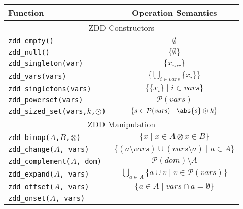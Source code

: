 \documentclass[english, aspectratio=169]{beamer}
\newcommand{\pow}[0]{\ensuremath{\mathcal{P}}}
\newcommand{\var}[0]{\ensuremath{\mathit{var}}}
\newcommand{\vars}[0]{\ensuremath{\mathit{vars}}}
\newcommand{\dom}[0]{\ensuremath{\mathit{dom}}}
\begin{document}
\blankframe



\begin{frame}
  \begin{table}
    \centering
    \tiny

    \begin{tabular}[t]{l | c}
      Function
      & Operation Semantics
      \\ \hline \hline
      \multicolumn{2}{c}{ZDD Constructors}
      \\ \hline
      \texttt{zdd\_empty()}
      & $\emptyset$
      \\
      \texttt{zdd\_null()}
      & $\{ \emptyset \}$
      \\
      \texttt{zdd\_singleton(var)}
      & $\{ x_{\var} \}$
      \\
      \texttt{zdd\_vars(vars)}
      & $\{ \bigcup_{i \in \vars} \{ x_i \} \}$
      \\
      \texttt{zdd\_singletons(vars)}
      & $\{ \{ x_{i} \} \mid i \in \vars \}$
      \\
      \texttt{zdd\_powerset(vars)}
      & $\pow(\vars)$
      \\
      \texttt{zdd\_sized\_set(vars,$k$,$\odot$)}
      & $\{ s \in \pow(\vars) \mid \abs{s} \odot k \}$
     \\ \hline
      \multicolumn{2}{c}{ZDD Manipulation}
      \\ \hline
      \texttt{zdd\_binop($A$,$B$,$\otimes$)}
      & $\{ x \mid x \in A \otimes x \in B \}$
      \\
      \texttt{zdd\_change($A$, vars)}
      & $\{ (a \setminus \mathit{vars}) \cup (\mathit{vars} \setminus a) \mid a \in A \}$
      \\
      \texttt{zdd\_complement($A$, dom)}
      & $\pow(\dom) \setminus A$
      \\
      \texttt{zdd\_expand($A$, vars)}
      & $\bigcup_{a \in A} \{ a \cup v \mid v \in \pow(\vars) \}$
      \\
      \texttt{zdd\_offset($A$, vars)}
      & $\{ a \in A \mid \vars \cap a = \emptyset \}$
      \\
      \texttt{zdd\_onset($A$, vars)}

\end{tabular}
\end{table}
\end{frame}
\end{document}
